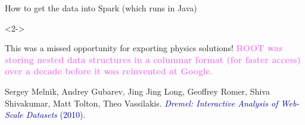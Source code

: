 \documentclass[aspectratio=169]{beamer}
\begin{document}
\begin{frame}{How to get the data into Spark (which runs in Java)}
\begin{uncoverenv}<2->
\vspace{-5.2 cm}
\begin{center}
\end{center}
\vspace{5 cm}
\end{uncoverenv}
\end{frame}

\begin{frame}{This was a missed opportunity for exporting physics solutions!}
\vspace{0.5 cm}
\large \textcolor{violet}{\bf ROOT was storing nested data structures in a columnar format (for faster access) over a decade before it was reinvented at Google.}

\vspace{-0.3 cm}
\begin{center}
\begin{minipage}{0.8\linewidth}
\vspace{0.5 cm}
\small Sergey Melnik, Andrey Gubarev, Jing Jing Long, Geoffrey Romer, Shiva Shivakumar, Matt Tolton, Theo Vassilakis. \textcolor{darkblue}{\normalsize {\it Dremel: Interactive Analysis of Web-Scale Datasets} (2010).}

\vspace{0.25 cm}
\end{minipage}
\end{center}
\end{frame}
\end{document}
